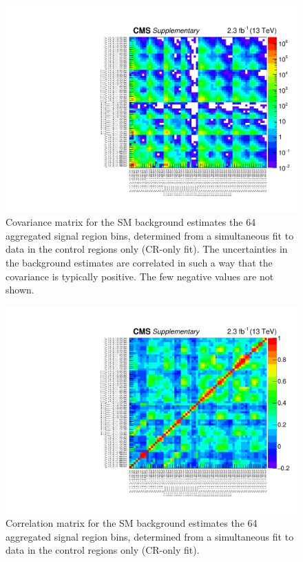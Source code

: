 \clearpage
\begin{figure}[!h]
  \begin{center}
    \includegraphics[width=\textwidth]{Supplementary/aggregated_covariance_aux.pdf} 
    \caption{Covariance matrix for the SM background estimates
      the 64 aggregated signal region bins, determined from a
      simultaneous fit to data in the control regions only (CR-only
      fit). The uncertainties in the background estimates are
      correlated in such a way that the covariance is typically
      positive. The few negative values are not shown. 
      \label{fig:aggr_corr} 
    }
  \end{center}
\end{figure}

\clearpage
\begin{figure}[!h]
  \begin{center}
    \includegraphics[width=\textwidth]{Supplementary/aggregated_correlation_aux.pdf} 
    \caption{Correlation matrix for the SM background estimates
      the 64 aggregated signal region bins, determined from a
      simultaneous fit to data in the control regions only (CR-only
      fit).
      \label{fig:aggr_corr} 
    }
  \end{center}
\end{figure}

